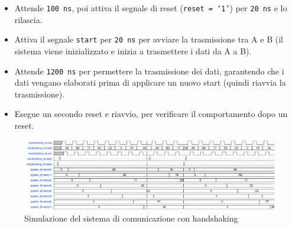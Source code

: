 \begin{itemize}
\begin{itemize}
        \begin{itemize}
            \item Attende \texttt{100 ns}, poi attiva il segnale di reset (\texttt{reset = `1'}) per \texttt{20 ns} e lo rilascia.
            \item Attiva il segnale \texttt{start} per \texttt{20 ns} per avviare la trasmissione tra A e B (il sistema viene inizializzato e inizia a trasmettere i dati da A a B).
            \item Attende \texttt{1200 ns} per permettere la trasmissione dei dati, garantendo che i dati vengano elaborati prima di applicare un nuovo start (quindi riavvia la trasmissione).
            \item Esegue un secondo reset e riavvio, per verificare il comportamento dopo un reset.
        \end{itemize}
    \end{itemize}
\end{itemize}

\begin{figure}[h]
    \centering
    \includegraphics[width=\textwidth]{img/handshaking_tb.pdf}
    \caption{Simulazione del sistema di comunicazione con handshaking}
    \label{fig:handshaking_tb}
\end{figure}